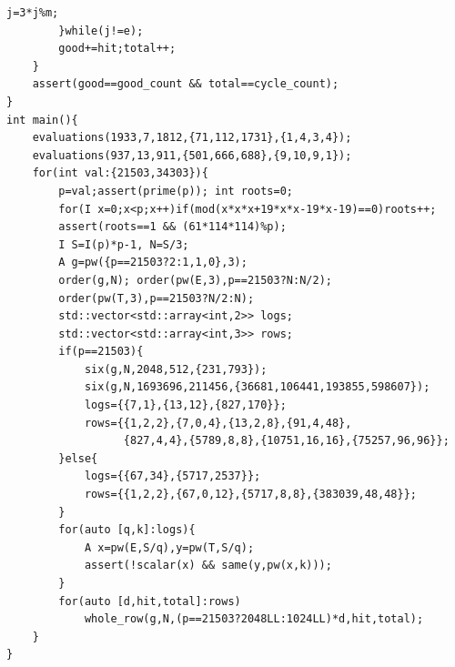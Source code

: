 \documentclass[11pt,a4paper,oneside,openany]{book}
\begin{document}
\begin{Verbatim}[fontsize=\footnotesize,breaklines,breakanywhere]
            j=3*j%m;
        }while(j!=e);
        good+=hit;total++;
    }
    assert(good==good_count && total==cycle_count);
}
int main(){
    evaluations(1933,7,1812,{71,112,1731},{1,4,3,4});
    evaluations(937,13,911,{501,666,688},{9,10,9,1});
    for(int val:{21503,34303}){
        p=val;assert(prime(p)); int roots=0;
        for(I x=0;x<p;x++)if(mod(x*x*x+19*x*x-19*x-19)==0)roots++;
        assert(roots==1 && (61*114*114)%p);
        I S=I(p)*p-1, N=S/3;
        A g=pw({p==21503?2:1,1,0},3);
        order(g,N); order(pw(E,3),p==21503?N:N/2);
        order(pw(T,3),p==21503?N/2:N);
        std::vector<std::array<int,2>> logs;
        std::vector<std::array<int,3>> rows;
        if(p==21503){
            six(g,N,2048,512,{231,793});
            six(g,N,1693696,211456,{36681,106441,193855,598607});
            logs={{7,1},{13,12},{827,170}};
            rows={{1,2,2},{7,0,4},{13,2,8},{91,4,48},
                  {827,4,4},{5789,8,8},{10751,16,16},{75257,96,96}};
        }else{
            logs={{67,34},{5717,2537}};
            rows={{1,2,2},{67,0,12},{5717,8,8},{383039,48,48}};
        }
        for(auto [q,k]:logs){
            A x=pw(E,S/q),y=pw(T,S/q);
            assert(!scalar(x) && same(y,pw(x,k)));
        }
        for(auto [d,hit,total]:rows)
            whole_row(g,N,(p==21503?2048LL:1024LL)*d,hit,total);
    }
}
\end{Verbatim}
\end{document}
